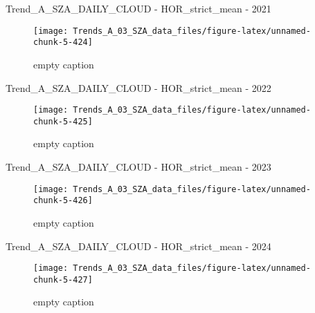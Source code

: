 \documentclass[
  10pt,
  a4paper,oneside]{article}
\begin{document}
Trend\_A\_SZA\_DAILY\_CLOUD - HOR\_strict\_mean - 2021

\begin{figure}[!ht]

{\centering \texttt{[image: Trends\_A\_03\_SZA\_data\_files/figure-latex/unnamed-chunk-5-424]} 

}

\caption{ empty caption }\label{fig:unnamed-chunk-5-424}
\end{figure}

Trend\_A\_SZA\_DAILY\_CLOUD - HOR\_strict\_mean - 2022

\begin{figure}[!ht]

{\centering \texttt{[image: Trends\_A\_03\_SZA\_data\_files/figure-latex/unnamed-chunk-5-425]} 

}

\caption{ empty caption }\label{fig:unnamed-chunk-5-425}
\end{figure}

Trend\_A\_SZA\_DAILY\_CLOUD - HOR\_strict\_mean - 2023

\begin{figure}[!ht]

{\centering \texttt{[image: Trends\_A\_03\_SZA\_data\_files/figure-latex/unnamed-chunk-5-426]} 

}

\caption{ empty caption }\label{fig:unnamed-chunk-5-426}
\end{figure}

Trend\_A\_SZA\_DAILY\_CLOUD - HOR\_strict\_mean - 2024

\begin{figure}[!ht]

{\centering \texttt{[image: Trends\_A\_03\_SZA\_data\_files/figure-latex/unnamed-chunk-5-427]} 

}

\caption{ empty caption }\label{fig:unnamed-chunk-5-427}
\end{figure}
\end{document}
